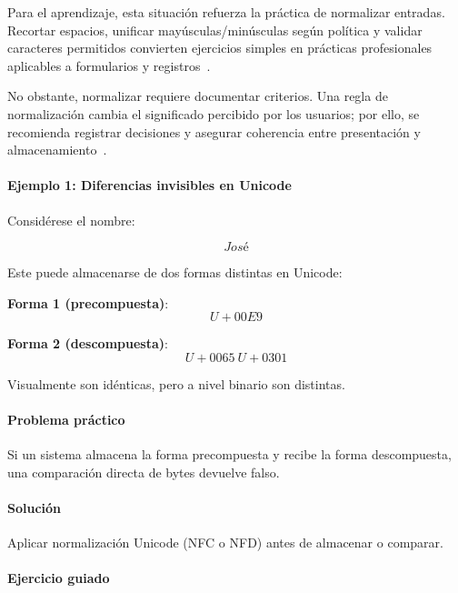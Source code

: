 \documentclass[12pt,twoside]{book}
\begin{document}
						Para el aprendizaje, esta situación refuerza la práctica de normalizar entradas. Recortar espacios, unificar mayúsculas/minúsculas según política y validar caracteres permitidos convierten ejercicios simples en prácticas profesionales aplicables a formularios y registros~\cite{Gaddis2022Starting,Hanly2015Problem,Kendall2014Systems}.
						
						No obstante, normalizar requiere documentar criterios. Una regla de normalización cambia el significado percibido por los usuarios; por ello, se recomienda registrar decisiones y asegurar coherencia entre presentación y almacenamiento~\cite{Ghezzi2003Fundamentals,Sommerville2015Software,Laudon2020Management}.
						
						\paragraph{Ejemplo 1: Diferencias invisibles en Unicode}
						
						\noindent
						Considérese el nombre:
						
						\[
						José
						\]
						
						Este puede almacenarse de dos formas distintas en Unicode:
						
						\textbf{Forma 1 (precompuesta)}:
						\[
						U+00E9
						\]
						
						\textbf{Forma 2 (descompuesta)}:
						\[
						U+0065\ U+0301
						\]
						
						Visualmente son idénticas, pero a nivel binario son distintas.
						
						\paragraph{Problema práctico}
						
						Si un sistema almacena la forma precompuesta y recibe la forma descompuesta, una comparación directa de bytes devuelve falso.
						
						\paragraph{Solución}
						
						Aplicar normalización Unicode (NFC o NFD) antes de almacenar o comparar.
						
						\paragraph{Ejercicio guiado}
						
\end{document}
